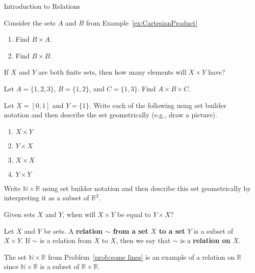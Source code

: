 \begin{section}{Introduction to Relations}
\begin{problem}
Consider the sets $A$ and $B$ from Example~\ref{ex:CartesianProduct}
\begin{enumerate}[label=\textrm{(\alph*)}]
\item Find $B\times A$. 
\item Find $B\times B$.
\end{enumerate}
\end{problem}

\begin{problem}
If $X$ and $Y$ are both finite sets, then how many elements will $X\times Y$ have?
\end{problem}

\begin{problem} 
Let $A=\{1, 2, 3\}$, $B=\{1,2\}$, and $C=\{1,3\}$. Find $A \times B\times C$. 
\end{problem}

\begin{problem}
Let $X=[0,1]$ and $Y=\{1\}$.  Write each of the following using set builder notation and then describe the set geometrically (e.g., draw a picture). 
\begin{enumerate}[label=\textrm{(\alph*)}]
\item $X\times Y$
\item $Y\times X$
\item $X\times X$
\item $Y\times Y$
\end{enumerate}
\end{problem}

\begin{problem}\label{prob:some lines}
Write $\mathbb{N}\times \mathbb{R}$ using set builder notation and then describe this set geometrically by interpreting it as a subset of $\mathbb{R}^2$.
\end{problem}

\begin{problem}
Given sets $X$ and $Y$, when will $X\times Y$ be equal to $Y\times X$?
\end{problem}

\begin{definition}
Let $X$ and $Y$ be sets. A \textbf{relation $\sim$ from a set $X$ to a set $Y$} is a subset of $X \times Y$. If $\sim$ is a relation from $X$ to $X$, then we say that $\sim$ is a \textbf{relation on $X$}.  
\end{definition}

\begin{example}
The set $\mathbb{N}\times \mathbb{R}$ from Problem~\ref{prob:some lines} is an example of a relation on $\mathbb{R}$ since $\mathbb{N}\times \mathbb{R}$ is a subset of $\mathbb{R}\times \mathbb{R}$.
\end{example}


\end{section}
